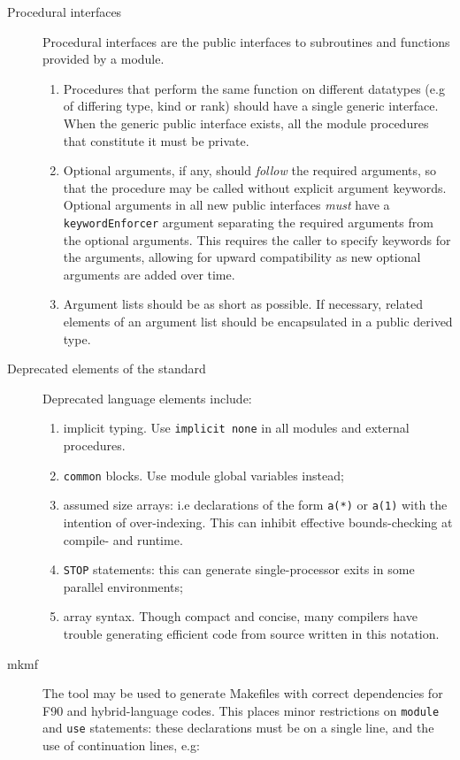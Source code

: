 \begin{description}
\item[Procedural interfaces] Procedural interfaces are the public
  interfaces to subroutines and functions provided by a module.

\begin{enumerate}
\item Procedures that perform the same function on different datatypes
  (e.g of differing type, kind or rank) should have a single generic
  interface. When the generic public interface exists, all the
  module procedures that constitute it must be private.
\item Optional arguments, if any, should \emph{follow} the required
  arguments, so that the procedure may be called without explicit
  argument keywords.  Optional arguments in all new public interfaces \emph{must}
  have a \texttt{keywordEnforcer} argument separating the required arguments from the
  optional arguments.  This requires the caller to specify keywords for the arguments,
  allowing for upward compatibility as new optional arguments are added over time.
\item Argument lists should be as short as possible. If necessary, related elements of
  an argument list should be encapsulated in a public derived type.
\end{enumerate}

\item[Deprecated elements of the standard] Deprecated language
  elements include:

\begin{enumerate}
\item implicit typing.  Use \texttt{implicit none} in all modules and external
  procedures.
\item \texttt{common} blocks. Use module global variables instead;
\item assumed size arrays: i.e declarations of the form \texttt{a(*)}
  or \texttt{a(1)} with the intention of over-indexing. This can
  inhibit effective bounds-checking at compile- and runtime.
\item \texttt{STOP} statements: this can generate single-processor
  exits in some parallel environments;
\item array syntax. Though compact and concise, many compilers have
  trouble generating efficient code from source written in this
  notation.
\end{enumerate}

\item[mkmf] The
   tool
  may be used to generate Makefiles with correct dependencies for F90
  and hybrid-language codes. This places minor restrictions on
  \texttt{module} and \texttt{use} statements: these declarations must
  be on a single line, and the use of continuation lines, e.g:



\end{description}
